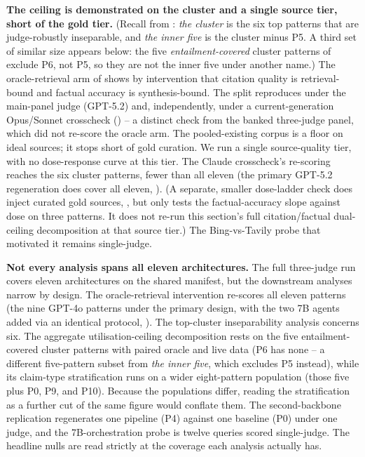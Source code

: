 \documentclass[11pt]{article}
\begin{document}
\textbf{The ceiling is demonstrated on the cluster and a single source tier, short of the
gold tier.} (Recall from : \emph{the cluster} is the six
top patterns that are judge-robustly inseparable, and \emph{the inner five} is the cluster minus
P5. A third set of similar size appears below: the five \emph{entailment-covered} cluster
patterns of  exclude P6, not P5, so they are not the inner five under
another name.) The oracle-retrieval arm of  shows by intervention that citation
quality is retrieval-bound and factual accuracy is synthesis-bound. The split reproduces
under the main-panel judge (GPT-5.2) and, independently, under a current-generation
Opus/Sonnet crosscheck () -- a distinct check from the banked
three-judge panel, which did not re-score the oracle arm. The pooled-existing corpus is a floor on ideal
sources; it stops short of gold curation. We run a single source-quality tier, with no
dose-response curve at this tier. The Claude crosscheck's re-scoring reaches
the six cluster patterns, fewer than all eleven (the primary GPT-5.2 regeneration does
cover all eleven, ). (A separate, smaller dose-ladder check does inject
curated gold sources, , but only tests the factual-accuracy slope against
dose on three patterns. It does not re-run this section's full citation/factual dual-ceiling
decomposition at that source tier.) The Bing-vs-Tavily probe
that motivated it remains single-judge.

\textbf{Not every analysis spans all eleven architectures.} The full three-judge run covers
eleven architectures on the shared manifest, but the downstream analyses narrow by design.
The oracle-retrieval intervention re-scores all eleven patterns
(the nine GPT-4o patterns under the primary design, with the two 7B agents added via an
identical protocol, ). The
top-cluster inseparability analysis concerns six. The aggregate utilisation-ceiling decomposition
rests on the five entailment-covered cluster patterns with paired oracle and live data (P6
has none -- a different five-pattern subset from \emph{the inner five}, which excludes P5
instead), while its
claim-type stratification runs on a wider eight-pattern population (those five plus P0, P9, and
P10). Because the populations differ, reading the stratification as a further cut of the
same figure would conflate them.
The second-backbone replication regenerates one pipeline (P4) against one baseline
(P0) under one judge, and the 7B-orchestration probe is twelve queries scored single-judge.
The headline nulls are read strictly at the coverage each analysis actually has.
\end{document}
